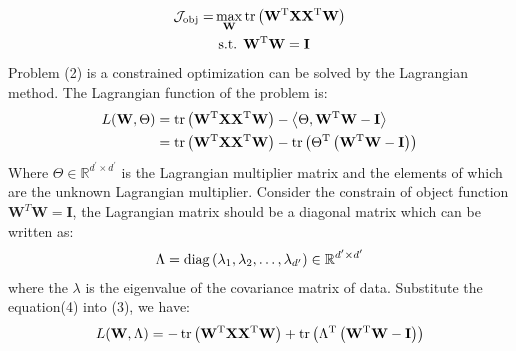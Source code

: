 \documentclass{cta-author}
\begin{document}
\begin{equation}
\centering
\begin{split}
\begin{aligned}
\begin{aligned}
\mathcal{J}_{\mathrm{obj}}=& \max _{\mathbf{W}}\operatorname{tr}\left(\mathbf{W}^{\mathrm{T}} \mathbf{X} \mathbf{X}^{\mathrm{T}} \mathbf{W}\right) \\
& \text { s.t. } \mathbf{W}^{\mathrm{T}} \mathbf{W}=\mathbf{I} 
\end{aligned}
\end{aligned}
\end{split}
\label{eq:mi}
\end{equation}
Problem (2) is a constrained optimization can be solved by the Lagrangian method. The Lagrangian function of the problem is:
\begin{equation}
\centering
\begin{split}
\begin{aligned}
L(\mathbf{W}, \Theta) & =\operatorname{tr}\left(\mathbf{W}^{\mathrm{T}} \mathbf{X} \mathbf{X}^{\mathrm{T}} \mathbf{W}\right)-\left\langle\Theta, \mathbf{W}^{\mathrm{T}} \mathbf{W}-\mathbf{I}\right\rangle \\
& =\operatorname{tr}\left(\mathbf{W}^{\mathrm{T}} \mathbf{X} \mathbf{X}^{\mathrm{T}} \mathbf{W}\right)-\operatorname{tr}\left(\Theta^{\mathrm{T}}\left(\mathbf{W}^{\mathrm{T}} \mathbf{W}-\mathbf{I}\right)\right)
\end{aligned}
\end{split}
\label{eq:mi}
\end{equation}
Where $\Theta \in \mathbb{R}^{d^{\prime} \times d^{\prime}}$ is the Lagrangian multiplier matrix and the elements of which are the unknown Lagrangian multiplier. Consider the constrain of object function $\boldsymbol{W}^T\boldsymbol{W}=\boldsymbol{I}$, the Lagrangian matrix should be a diagonal matrix which can be written as:
\begin{equation}
\centering
\begin{split}
\Lambda=\operatorname{diag}\left(\lambda_1, \lambda_2, \ldots, \lambda_{d^{\prime}}\right) \in \mathbb{R}^{d^{\prime} \times d^{\prime}}
\end{split}
\label{eq:mi}
\end{equation}
where the $\lambda$ is the eigenvalue of the covariance matrix of data. Substitute the equation(4) into (3), we have:
\begin{equation}
\centering
\begin{split}
L(\mathbf{W}, \Lambda)=-\operatorname{tr}\left(\mathbf{W}^{\mathrm{T}} \mathbf{X} \mathbf{X}^{\mathrm{T}} \mathbf{W}\right)+\operatorname{tr}\left(\Lambda^{\mathrm{T}}\left(\mathbf{W}^{\mathrm{T}} \mathbf{W}-\mathbf{I}\right)\right)
\end{split}
\label{eq:mi}
\end{equation}
\end{document}
